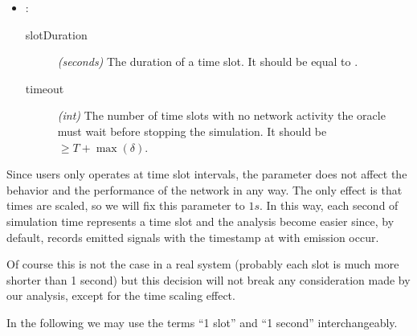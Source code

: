 \begin{itemize}
	\item {}:
		\begin{description}
			\item[slotDuration] \textit{(seconds)} The duration of a
				time slot. It should be equal to
				.
			\item[timeout] \textit{(int)} The number of time slots
				with no network activity the oracle must wait
				before stopping the simulation. It should be
				\(\geq T+\max(\delta)\).
		\end{description}
\end{itemize}

\begin{tcolorbox}[title=Note]
	Since users only operates at time slot intervals, the parameter
	 does not affect the behavior and the performance of
	the network in any way. The only effect is that times  are scaled, so we will fix this parameter to \(1s\). In
	this way, each second of simulation time represents a time slot and the
	analysis become easier since, by default, \omnetpp{} records emitted
	signals with the timestamp at with emission occur.

	Of course this is not the case in a real system (probably each slot is
	much more shorter than 1 second) but this decision will not break any
	consideration made by our analysis, except for the time scaling effect.

	In the following we may use the terms ``1 slot'' and ``1 second''
	interchangeably.
\end{tcolorbox}
